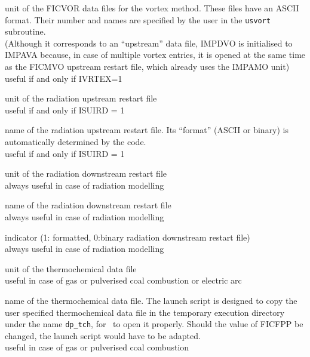 {unit of the FICVOR data files for the vortex method. These files have an ASCII
format. Their number and names are specified by the user in the \texttt{usvort} subroutine.\\
(Although it corresponds to an ``upstream'' data file, IMPDVO is initialised to
IMPAVA because, in case of multiple vortex entries, it is opened at the same time
as the FICMVO upstream restart file, which already uses the IMPAMO unit)\\ 
useful if and only if IVRTEX=1}



{unit of the radiation upstream restart file\\
useful if and only if ISUIRD = 1}

{name of the radiation upstream restart file. Its ``format'' (ASCII or
binary) is automatically determined by the code.\\ 
useful if and only if ISUIRD = 1}

{unit of the radiation downstream restart file\\ 
always useful in case of radiation modelling}

{name of the radiation downstream restart file \\
always useful in case of radiation modelling}

{indicator (1: formatted, 0:binary radiation downstream restart file)\\
always useful in case of radiation modelling}




{unit of the thermochemical data file\\ 
useful in case of gas or pulverised coal combustion or electric arc}

{name of the thermochemical data file. The launch script is designed to copy the
user specified thermochemical data file in the temporary execution directory
under the name \texttt{dp\_tch}, for \CS\ to open it properly. Should the value
of FICFPP be changed, the launch script would have to be adapted.\\
useful in case of gas or pulverised coal combustion}

